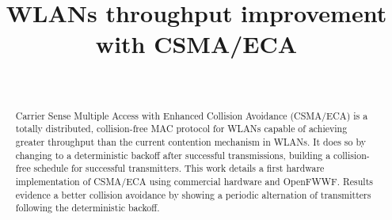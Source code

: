 \documentclass[conference]{IEEEtran}
\begin{document}
 \title{WLANs throughput improvement with CSMA/ECA}


  \author{
      \\
  }




\maketitle

\begin{abstract}
Carrier Sense Multiple Access with Enhanced Collision Avoidance (CSMA/ECA) is a totally distributed, collision-free MAC protocol for WLANs capable of achieving greater throughput than the current contention mechanism in WLANs. It does so by changing to a deterministic backoff after successful transmissions, building a collision-free schedule for successful transmitters. This work details a first hardware implementation of CSMA/ECA using commercial hardware and OpenFWWF. Results evidence a better collision avoidance by showing a periodic alternation of transmitters following the deterministic backoff.

\end{abstract}
\end{document}
